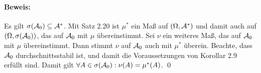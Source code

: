 \paragraph{Beweis:}Es gilt $\sigma(\mathcal{A}_0)\subseteq\mathcal{A}^*$. Mit Satz 2.20 ist $\mu^*$ ein Ma\ss{} auf $(\Omega,\mathcal{A}^*)$ und damit auch auf $(\Omega,\sigma(\mathcal{A}_0))$, das auf $\mathcal{A}_0$ mit $\mu$ \"ubereinstimmt. Sei $\nu$ ein weiteres Ma\ss{}, das auf $\mathcal{A}_0$ mit $\mu$ \"ubereinstimmt. Dann stimmt $\nu$ auf $\mathcal{A}_0$ auch mit $\mu^*$ \"uberein. Beachte, dass $\mathcal{A}_0$ durchschnittsstabil ist, und damit die Voraussetzungen von Korollar 2.9 erf\"ullt sind. Damit gilt $\forall A\in\sigma(\mathcal{A}_0):\nu(A)=\mu^*(A)$. \qed